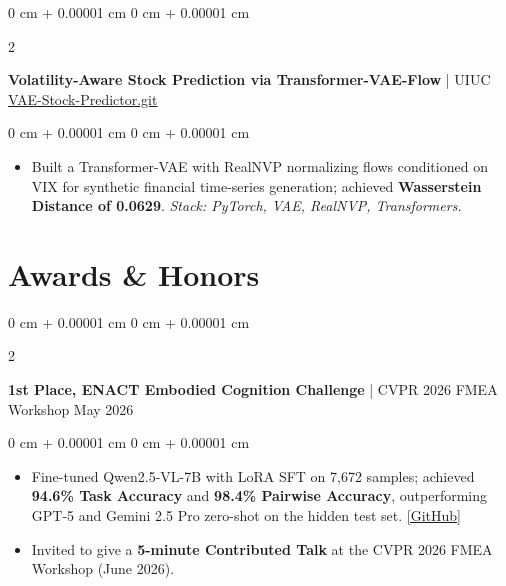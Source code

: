 \documentclass[10pt, letterpaper]{article}
\newenvironment{highlights}{
    \begin{itemize}[
        topsep=0.10 cm,
        parsep=0.10 cm,
        partopsep=0pt,
        itemsep=0pt,
        leftmargin=0 cm + 10pt
    ]
}{
    \end{itemize}
} %
\newenvironment{onecolentry}{
    \begin{adjustwidth}{
        0 cm + 0.00001 cm
    }{
        0 cm + 0.00001 cm
    }
}{
    \end{adjustwidth}
} %
\newenvironment{twocolentry}[2][]{
    \onecolentry
    \def\secondColumn{#2}
    \setcolumnwidth{\fill, 4.5 cm}
    \begin{paracol}{2}
}{
    \switchcolumn \raggedleft \secondColumn
    \end{paracol}
    \endonecolentry
} %
\begin{document}
        \begin{twocolentry}{
            \href{https://github.com/muralikarteek7/Transformer-VAE-Stock-Predictor/tree/main}{VAE-Stock-Predictor.git}
        }
            {\textbf{Volatility-Aware Stock Prediction via Transformer-VAE-Flow} | UIUC}\end{twocolentry}

        \vspace{0.05 cm}
        \begin{onecolentry}
            \begin{highlights}
                \item Built a Transformer-VAE with RealNVP normalizing flows conditioned on VIX for synthetic financial time-series generation; achieved \textbf{Wasserstein Distance of 0.0629}. \textit{Stack: PyTorch, VAE, RealNVP, Transformers.}
            \end{highlights}
        \end{onecolentry}
        


        


   \section{Awards \& Honors}

        \begin{twocolentry}{
            May 2026
        }
            \textbf{1st Place, ENACT Embodied Cognition Challenge} | CVPR 2026 FMEA Workshop\end{twocolentry}

        \vspace{0.05 cm}
        \begin{onecolentry}
            \begin{highlights}
                \item Fine-tuned Qwen2.5-VL-7B with LoRA SFT on 7,672 samples; achieved \textbf{94.6\% Task Accuracy} and \textbf{98.4\% Pairwise Accuracy}, outperforming GPT-5 and Gemini 2.5 Pro zero-shot on the hidden test set. \href{https://github.com/muralikarteek7/ENACT-Qwen2.5VL}{[GitHub]}
                \item Invited to give a \textbf{5-minute Contributed Talk} at the CVPR 2026 FMEA Workshop (June 2026).
            \end{highlights}
        \end{onecolentry}

        \vspace{0.1 cm}
\end{document}
